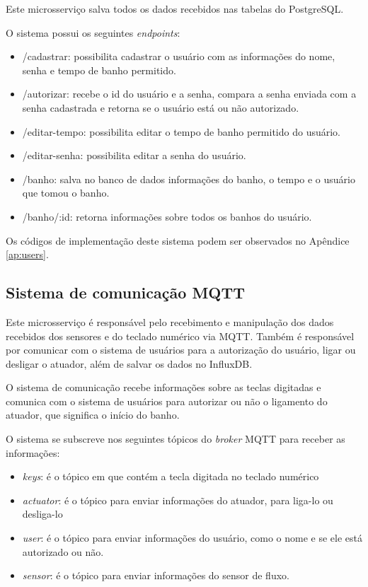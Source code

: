 Este microsserviço salva todos os dados recebidos nas tabelas do PostgreSQL.

O sistema possui os seguintes \textit{endpoints}:


\begin{itemize} \label{item:endpoints}
	\item /cadastrar: possibilita cadastrar o usuário com as informações do nome, senha e tempo de banho permitido.
	\item /autorizar: recebe o id do usuário e a senha, compara a senha enviada com a senha cadastrada e retorna se o usuário está ou não autorizado.
	\item /editar-tempo: possibilita editar o tempo de banho permitido do usuário.
	\item /editar-senha: possibilita editar a senha do usuário.
	\item /banho: salva no banco de dados informações do banho, o tempo e o usuário que tomou o banho.
	\item /banho/:id: retorna informações sobre todos os banhos do usuário.
\end{itemize}

Os códigos de implementação deste sistema podem ser observados no Apêndice \ref{ap:users}.

\subsection{Sistema de comunicação MQTT}

Este microsserviço é responsável pelo recebimento e manipulação dos dados recebidos dos sensores e do teclado numérico via MQTT. Também é responsável por comunicar com o sistema de usuários para a autorização do usuário, ligar ou desligar o atuador, além de salvar os dados no InfluxDB.

O sistema de comunicação recebe informações sobre as teclas digitadas e comunica com o sistema de usuários para autorizar ou não o ligamento do atuador, que significa o início do banho.

O sistema se subscreve nos seguintes tópicos do \textit{broker} MQTT para receber as informações:

\begin{itemize}
	\item \textit{keys}: é o tópico em que contém a tecla digitada no teclado numérico
	\item \textit{actuator}: é o tópico para enviar informações do atuador, para liga-lo ou desliga-lo
	\item \textit{user}: é o tópico para enviar informações do usuário, como o nome e se ele está autorizado ou não.
	\item \textit{sensor}: é o tópico para enviar informações do sensor de fluxo.
\end{itemize}

